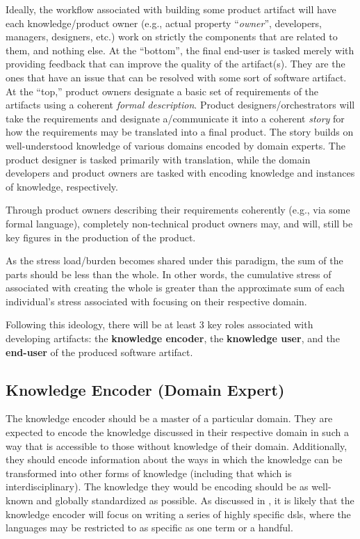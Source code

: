 Ideally, the workflow associated with building some product artifact will have
each knowledge/product owner (e.g., actual property ``\textit{owner}'',
developers, managers, designers, etc.) work on strictly the components that are
related to them, and nothing else. At the ``bottom'', the final end-user is
tasked merely with providing feedback that can improve the quality of the
artifact(s). They are the ones that have an issue that can be resolved with some
sort of software artifact. At the ``top,'' product owners designate a basic set
of requirements of the artifacts using a coherent \textit{formal description}.
Product designers/orchestrators will take the requirements and designate
a/communicate it into a coherent \textit{story} for how the requirements may be
translated into a final product. The story builds on well-understood knowledge
of various domains encoded by domain experts. The product designer is tasked
primarily with translation, while the domain developers and product owners are
tasked with encoding knowledge and instances of knowledge, respectively.

Through product owners describing their requirements coherently (e.g., via some
formal language), completely non-technical product owners may, and will, still
be key figures in the production of the product.

As the stress load/burden becomes shared under this paradigm, the sum of the
parts should be less than the whole. In other words, the cumulative stress of
associated with creating the whole is greater than the approximate sum of each
individual's stress associated with focusing on their respective domain.

Following this ideology, there will be at least 3 key roles associated with
developing artifacts: the \textbf{knowledge encoder}, the \textbf{knowledge
user}, and the \textbf{end-user} of the produced software artifact.

\subsection{Knowledge Encoder (Domain Expert)}
\label{chap:ideology:sec:a_prospective_workflow:subsec:knowledge_encoder}

The knowledge encoder should be a master of a particular domain. They are
expected to encode the knowledge discussed in their respective domain in such a
way that is accessible to those without knowledge of their domain. Additionally,
they should encode information about the ways in which the knowledge can be
transformed into other forms of knowledge (including that which is
interdisciplinary). The knowledge they would be encoding should be as well-known
and globally standardized as possible. As discussed in
, it is
likely that the knowledge encoder will focus on writing a series of highly
specific \acsp{dsl}, where the languages may be restricted to as specific as one
term or a handful.

